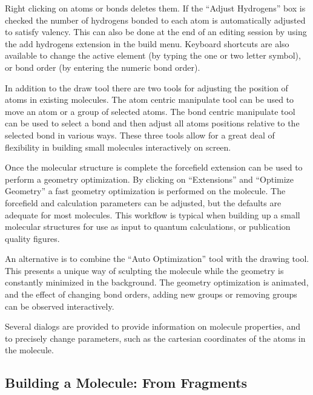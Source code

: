 \documentclass{article}
\begin{document}
Right clicking on atoms or bonds deletes them. If the ``Adjust Hydrogens'' box is checked the number of hydrogens bonded to each atom is automatically adjusted to satisfy valency. This can also be done at the end of an editing session by using the add hydrogens extension in the build menu. Keyboard shortcuts are also available to change the active element (by typing the one or two letter symbol), or bond order (by entering the numeric bond order).

In addition to the draw tool there are two tools for adjusting the position of atoms in existing molecules. The atom centric manipulate tool can be used to move an atom or a group of selected atoms. The bond centric manipulate tool can be used to select a bond and then adjust all atoms positions relative to the selected bond in various ways. These three tools allow for a great deal of flexibility in building small molecules interactively on screen.

Once the molecular structure is complete the forcefield extension can be used to perform a geometry optimization. By clicking on ``Extensions'' and ``Optimize Geometry'' a fast geometry optimization is performed on the molecule. The forcefield and calculation parameters can be adjusted, but the defaults are adequate for most molecules. This workflow is typical when building up a small molecular structures for use as input to quantum calculations, or publication quality figures.

An alternative is to combine the ``Auto Optimization'' tool with the drawing tool. This presents a unique way of sculpting the molecule while the geometry is constantly minimized in the background. The geometry optimization is animated, and the effect of changing bond orders, adding new groups or removing groups can be observed interactively.

Several dialogs are provided to provide information on molecule properties, and to precisely change parameters, such as the cartesian coordinates of the atoms in the molecule.

\subsection{Building a Molecule: From Fragments} %
\end{document}
